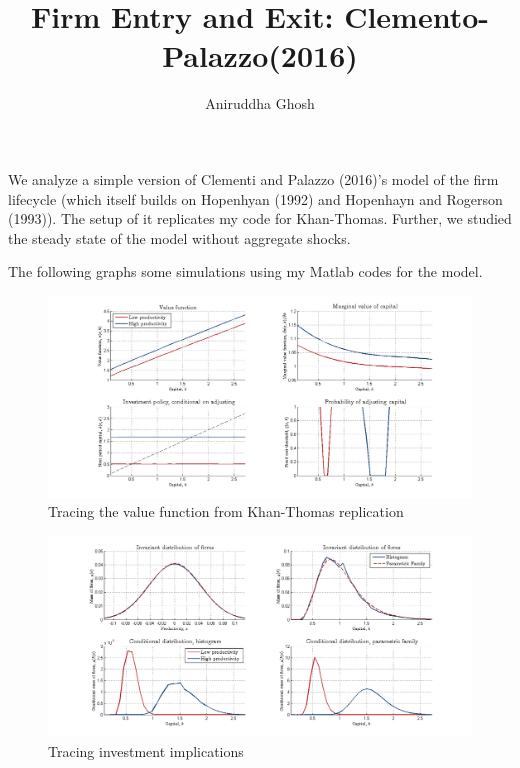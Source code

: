 \documentclass[../main.tex]{subfiles}
\title{Firm Entry and Exit: Clemento-Palazzo(2016)}
\author{Aniruddha Ghosh}
\begin{document}
\maketitle
We analyze a simple version of Clementi and Palazzo (2016)’s model of the firm lifecycle (which
itself builds on Hopenhyan (1992) and Hopenhayn and Rogerson (1993)). The setup of it
replicates my code for Khan-Thomas. Further, we studied the steady state of the model without aggregate
shocks.

The following graphs some simulations using my Matlab codes for the model.
\begin{figure}[h]
\caption{Tracing the value function from Khan-Thomas replication}
\includegraphics[scale=0.5]{../Appendix/Vf-1.png}
\end{figure}

\begin{figure}[h]
\caption{Tracing investment implications}
\includegraphics[scale=0.5]{../Appendix/Vf-2.png}
\end{figure}
\end{document}

